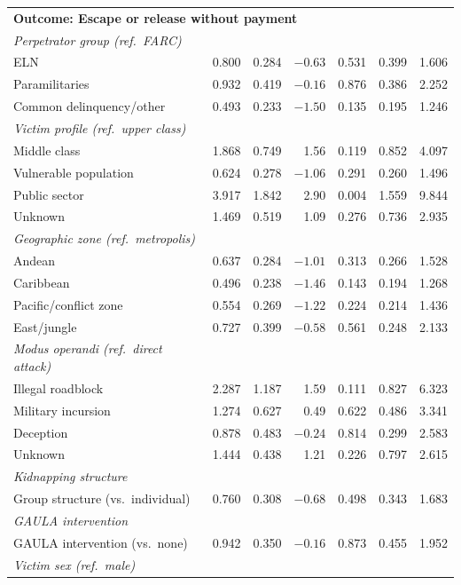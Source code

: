 {\begin{longtable}{@{}l r r r r c c@{}}
\multicolumn{7}{l}{\textbf{Outcome: Escape or release without payment}} \\
\textit{Perpetrator group (ref.\ FARC)} & & & & & & \\
ELN & 0.800 & 0.284 & $-0.63$ & 0.531 & 0.399 & 1.606 \\
Paramilitaries & 0.932 & 0.419 & $-0.16$ & 0.876 & 0.386 & 2.252 \\
Common delinquency/other & 0.493 & 0.233 & $-1.50$ & 0.135 & 0.195 & 1.246 \\
\addlinespace
\textit{Victim profile (ref.\ upper class)} & & & & & & \\
Middle class & 1.868 & 0.749 & 1.56 & 0.119 & 0.852 & 4.097 \\
Vulnerable population & 0.624 & 0.278 & $-1.06$ & 0.291 & 0.260 & 1.496 \\
Public sector & 3.917 & 1.842 & 2.90 & 0.004 & 1.559 & 9.844 \\
Unknown & 1.469 & 0.519 & 1.09 & 0.276 & 0.736 & 2.935 \\
\addlinespace
\textit{Geographic zone (ref.\ metropolis)} & & & & & & \\
Andean & 0.637 & 0.284 & $-1.01$ & 0.313 & 0.266 & 1.528 \\
Caribbean & 0.496 & 0.238 & $-1.46$ & 0.143 & 0.194 & 1.268 \\
Pacific/conflict zone & 0.554 & 0.269 & $-1.22$ & 0.224 & 0.214 & 1.436 \\
East/jungle & 0.727 & 0.399 & $-0.58$ & 0.561 & 0.248 & 2.133 \\
\addlinespace
\textit{Modus operandi (ref.\ direct attack)} & & & & & & \\
Illegal roadblock & 2.287 & 1.187 & 1.59 & 0.111 & 0.827 & 6.323 \\
Military incursion & 1.274 & 0.627 & 0.49 & 0.622 & 0.486 & 3.341 \\
Deception & 0.878 & 0.483 & $-0.24$ & 0.814 & 0.299 & 2.583 \\
Unknown & 1.444 & 0.438 & 1.21 & 0.226 & 0.797 & 2.615 \\
\addlinespace
\textit{Kidnapping structure} & & & & & & \\
Group structure (vs.\ individual) & 0.760 & 0.308 & $-0.68$ & 0.498 & 0.343 & 1.683 \\
\addlinespace
\textit{GAULA intervention} & & & & & & \\
GAULA intervention (vs.\ none) & 0.942 & 0.350 & $-0.16$ & 0.873 & 0.455 & 1.952 \\
\addlinespace
\textit{Victim sex (ref.\ male)} & & & & & & \\

\end{longtable}}
